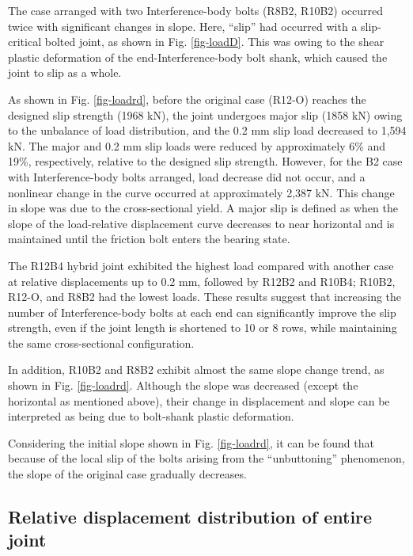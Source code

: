 The case arranged with two Interference-body bolts (R8B2, R10B2) occurred twice with significant changes in slope. Here, ``slip'' had occurred with a slip-critical bolted joint, as shown in Fig. \ref{fig-loadD}. This was owing to the shear plastic deformation of the end-Interference-body bolt shank, which caused the joint to slip as a whole. 

As shown in Fig. \ref{fig-loadrd}, before the original case (R12-O) reaches the designed slip strength (1968 kN), the joint undergoes major slip (1858 kN) owing to the unbalance of load distribution, and the 0.2 mm slip load decreased to 1,594 kN. The major and 0.2 mm slip loads were reduced by approximately 6\% and 19\%, respectively, relative to the designed slip strength. However, for the B2 case with Interference-body bolts arranged, load decrease did not occur, and a nonlinear change in the curve occurred at approximately 2,387 kN. This change in slope was due to the cross-sectional yield. A major slip is defined as when the slope of the load-relative displacement curve decreases to near horizontal and is maintained until the friction bolt enters the bearing state. 

The R12B4 hybrid joint exhibited the highest load compared with another case at relative displacements up to 0.2 mm, followed by R12B2 and R10B4; R10B2, R12-O, and R8B2 had the lowest loads. These results suggest that increasing the number of Interference-body bolts at each end can significantly improve the slip strength, even if the joint length is shortened to 10 or 8 rows, while maintaining the same cross-sectional configuration.

In addition, R10B2 and R8B2 exhibit almost the same slope change trend, as shown in Fig. \ref{fig-loadrd}. Although the slope was decreased (except the horizontal as mentioned above), their change in displacement and slope can be interpreted as being due to bolt-shank plastic deformation. 

 Considering the initial slope shown in Fig. \ref{fig-loadrd}, it can be found that because of the local slip of the bolts arising from the ``unbuttoning'' phenomenon, the slope of the original case gradually decreases. 

\subsection{Relative displacement distribution of entire joint}

